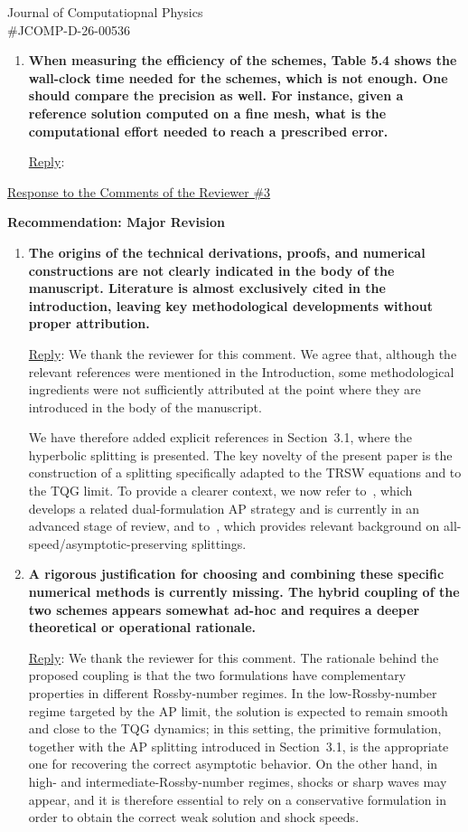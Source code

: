 \documentclass[letter,11pt]{letter}
\begin{document}
\begin{letter}{Journal of Computatiopnal Physics\\\#JCOMP-D-26-00536}
\begin{enumerate}
\medskip
\item
{\bf When measuring the efficiency of the schemes, Table 5.4 shows the wall-clock time needed for the schemes, which is not enough. One should compare the precision as well. For instance, given a reference solution computed on a fine mesh, what is the computational effort needed to reach a prescribed error.}

\medskip
{\sc\underline{Reply}}:
\end{enumerate}

\bigskip
\underline{Response to the Comments of the Reviewer \#3}

\medskip
{\bf{Recommendation: Major Revision}}
\begin{enumerate}
\item
{\bf The origins of the technical derivations, proofs, and numerical constructions
	are not clearly indicated in the body of the manuscript. Literature is
	almost exclusively cited in the introduction, leaving key methodological
	developments without proper attribution.}

\medskip
{\sc\underline{Reply}}: We thank the reviewer for this comment. We agree that, although the relevant references were mentioned in the Introduction, some methodological ingredients were not sufficiently attributed at the point where they are introduced in the body of the manuscript.

We have therefore added explicit references in Section~3.1, where the hyperbolic splitting is presented. The key novelty of the present paper is the construction of a splitting specifically adapted to the TRSW equations and to the TQG limit. To provide a clearer context, we now refer to~\cite{CKKM}, which develops a related dual-formulation AP strategy and is currently in an advanced stage of review, and to~\cite{Haack_2012}, which provides relevant background on all-speed/asymptotic-preserving splittings.



\bigskip 
\item
{\bf A rigorous justification for choosing and combining these specific numerical
	methods is currently missing. The hybrid coupling of the two schemes
	appears somewhat ad-hoc and requires a deeper theoretical or operational
	rationale.}

\medskip
{\sc\underline{Reply}}: We thank the reviewer for this comment. The rationale behind the proposed coupling is that the two formulations have complementary properties in different Rossby-number regimes. In the low-Rossby-number regime targeted by the AP limit, the solution is expected to remain smooth and close to the TQG dynamics; in this setting, the primitive formulation, together with the AP splitting introduced in Section~3.1, is the appropriate one for recovering the correct asymptotic behavior. On the other hand, in high- and intermediate-Rossby-number regimes, shocks or sharp waves may appear, and it is therefore essential to rely on a conservative formulation in order to obtain the correct weak solution and shock speeds.


\end{enumerate}
\end{letter}
\end{document}
